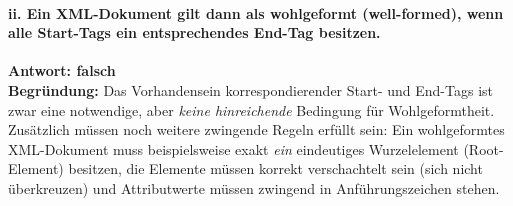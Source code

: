 \documentclass[12pt]{scrartcl}
\begin{document}
\paragraph*{ii. Ein XML-Dokument gilt dann als wohlgeformt (well-formed), wenn alle Start-Tags ein entsprechendes End-Tag besitzen.}
\textbf{Antwort: falsch} \\
\textbf{Begründung:} Das Vorhandensein korrespondierender Start- und End-Tags ist zwar eine notwendige, aber \textit{keine hinreichende} Bedingung für Wohlgeformtheit. Zusätzlich müssen noch weitere zwingende Regeln erfüllt sein: Ein wohlgeformtes XML-Dokument muss beispielsweise exakt \textit{ein} eindeutiges Wurzelelement (Root-Element) besitzen, die Elemente müssen korrekt verschachtelt sein (sich nicht überkreuzen) und Attributwerte müssen zwingend in Anführungszeichen stehen.
\end{document}
